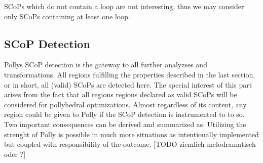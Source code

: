 SCoPs which do not contain
a loop are not interesting, thus we may consider only SCoPs containing at least
one loop.





\subsection{SCoP Detection}
Pollys SCoP detection is the gateway to all further analyzses and 
transformations. All regions fulfilling the properties described in the 
last section, or in short, all (valid) SCoPs are detected here. 
The special interest of this part arises from the fact that all 
regions regions declared as valid SCoPs will be considered for pollyhedral 
optimizations. Almost regardless of its content, any region could be given to
Polly if the SCoP detection is instrumented to to so. Two important consequences
can be derived and summarized as:
Utilizing the strenght of Polly is possible in much more situations as 
intentionally implemented but coupled with responsibility of the outcome. 
[TODO ziemlich melodramatisch oder ?]



